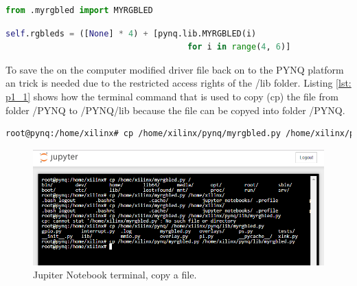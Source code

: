 \begin{lstlisting}[style=PythonStyle, language=Python, caption={Python code changed on line 45 of file \_\_init\_\_.py.},label=lst: p1_2]
from .myrgbled import MYRGBLED
\end{lstlisting}

\begin{lstlisting}[style=PythonStyle, language=Python, caption={Python code changed on line 99 of file base.py.},label=lst: p1_3]
self.rgbleds = ([None] * 4) + [pynq.lib.MYRGBLED(i)
                                     for i in range(4, 6)]
\end{lstlisting}

To save the on the computer modified driver file back on to the PYNQ platform an trick is needed due to the restricted access rights of the /lib folder. Listing \ref{lst: p1_1} shows how the terminal command that is used to copy (cp) the file from folder /PYNQ to /PYNQ/lib because the file can be copyed into folder /PYNQ.

\begin{lstlisting}[language=bash, caption={Jupiter Notebook terminal, copy a file.},label=lst: p1_1]
root@pynq:/home/xilinx# cp /home/xilinx/pynq/myrgbled.py /home/xilinx/pynq/lib/myrgbled.py
\end{lstlisting}
\begin{figure}[H]
	\centering
	\includegraphics[width=\textwidth]{01_images/p1_terminal_cp}
	\caption{Jupiter Notebook terminal, copy a file.}
	\label{fig: part1_terminal}
\end{figure}
\vspace{11pt}

